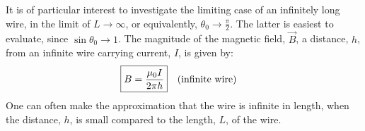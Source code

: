
It is of particular interest to investigate the limiting case of an infinitely long wire, in the limit of $L\to\infty$, or equivalently, $\theta_0\to\frac{\pi}{2}$. The latter is easiest to evaluate, since $\sin\theta_0\to 1$. The magnitude of the magnetic field, $\vec B$, a distance, $h$, from an infinite wire carrying current, $I$, is given by:
\begin{align*}
\Aboxed{ B &= \frac{\mu_0 I}{2\pi h}}\quad\text{(infinite wire)}
\end{align*}
One can often make the approximation that the wire is infinite in length, when the distance, $h$, is small compared to the length, $L$, of the wire. 
